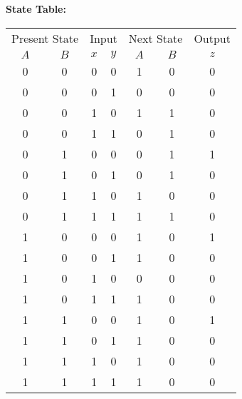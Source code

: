 \documentclass[a4paper,12pt]{article}
\begin{document}
\textbf{State Table:}
\begin{center}
	\begin{tabular}{ccccccc}
		\toprule
		\multicolumn{2}{c}{Present State} & \multicolumn{2}{c}{Input} & \multicolumn{2}{c}{Next State} & Output \\
		\cmidrule(lr){1-2} \cmidrule(lr){3-4} \cmidrule(lr){5-6} \cmidrule(lr){7-7}
		$A$ & $B$ & $x$ & $y$ & $A$ & $B$ & $z$ \\
		\midrule
		0 & 0 & 0 & 0 & 1 & 0 & 0 \\
		0 & 0 & 0 & 1 & 0 & 0 & 0 \\
		0 & 0 & 1 & 0 & 1 & 1 & 0 \\
		0 & 0 & 1 & 1 & 0 & 1 & 0 \\
		0 & 1 & 0 & 0 & 0 & 1 & 1 \\
		0 & 1 & 0 & 1 & 0 & 1 & 0 \\
		0 & 1 & 1 & 0 & 1 & 0 & 0 \\
		0 & 1 & 1 & 1 & 1 & 1 & 0 \\
		1 & 0 & 0 & 0 & 1 & 0 & 1 \\
		1 & 0 & 0 & 1 & 1 & 0 & 0 \\
		1 & 0 & 1 & 0 & 0 & 0 & 0 \\
		1 & 0 & 1 & 1 & 1 & 0 & 0 \\
		1 & 1 & 0 & 0 & 1 & 0 & 1 \\
		1 & 1 & 0 & 1 & 1 & 0 & 0 \\
		1 & 1 & 1 & 0 & 1 & 0 & 0 \\
		1 & 1 & 1 & 1 & 1 & 0 & 0 \\
		\bottomrule
	\end{tabular}
\end{center}
\end{document}
